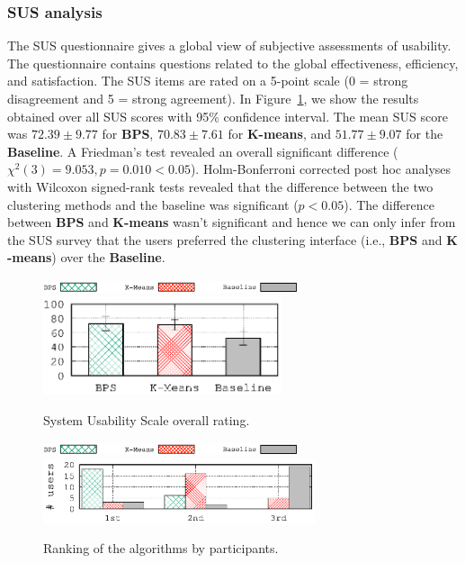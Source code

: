\subsubsection{SUS analysis}
The SUS questionnaire gives a global view of subjective assessments of usability. The questionnaire contains questions related to the global effectiveness, efficiency, and satisfaction. The SUS items are rated on a 5-point scale (0 = strong disagreement and 5 = strong agreement). In Figure~\ref{fig:SUS}, we show the results obtained over all SUS scores  with 95\% confidence interval. The mean SUS score was $72.39\pm 9.77$ for {\bf BPS}, $70.83\pm 7.61$ for {\bf $\mathbf{K}$-means}, and $51.77\pm 9.07$ for the {\bf Baseline}. A Friedman's test revealed an overall significant difference ($\chi^2(3)= 9.053, p=0.010 < 0.05$).
Holm-Bonferroni corrected post hoc analyses with Wilcoxon signed-rank tests 
revealed that the difference between the two clustering methods and the baseline was significant ($p < 0.05$). The difference between {\bf BPS} and {\bf $\mathbf{K}$-means} wasn't significant and hence we can only infer from the SUS survey that the users preferred the clustering interface (i.e., {\bf BPS} and {\bf $\mathbf{K}$-means}) over the {\bf Baseline}.%


\begin{figure}[t!]
\begin{centering}
\includegraphics[width=7.5cm]{imgs/legend4}
{\includegraphics[width=7cm]{imgs/SUS_AVERAGE}}
\par\end{centering}
\caption{System Usability Scale overall rating.}
\label{fig:SUS}
\end{figure}



\begin{figure}[t!]
\begin{centering}
\includegraphics[width=7.5cm]{imgs/legend4}\\
{\includegraphics[width=8cm]{imgs/ranking}}
\par\end{centering}
\caption{Ranking of the algorithms by participants.}
\label{fig:UserSurveyRanking}
\end{figure}
